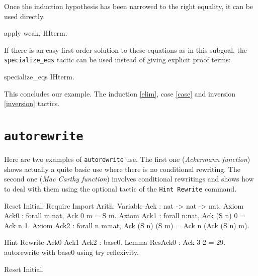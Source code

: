 Once the induction hypothesis has been narrowed to the right equality,
it can be used directly. 

\begin{coq_example}
  apply weak, IHterm.
\end{coq_example}

If there is an easy first-order solution to these equations as in this subgoal, the
{\tt specialize\_eqs} tactic can be used instead of giving explicit proof
terms:

\begin{coq_example}
  specialize_eqs IHterm.
\end{coq_example}
This concludes our example.
\SeeAlso The induction \ref{elim}, case \ref{case} and inversion \ref{inversion} tactics.

\section[\tt autorewrite]{\tt autorewrite\label{autorewrite-example}}

Here are two examples of {\tt autorewrite} use. The first one ({\em Ackermann
function}) shows actually a quite basic use where there is no conditional
rewriting. The second one ({\em Mac Carthy function}) involves conditional
rewritings and shows how to deal with them using the optional tactic of the
{\tt Hint~Rewrite} command.

\firstexample
{}

\begin{coq_example*}
Reset Initial.
Require Import Arith.
Variable Ack : 
           nat -> nat -> nat.
Axiom Ack0 : 
        forall m:nat, Ack 0 m = S m.
Axiom Ack1 : forall n:nat, Ack (S n) 0 = Ack n 1.
Axiom Ack2 : forall n m:nat, Ack (S n) (S m) = Ack n (Ack (S n) m).
\end{coq_example*}

\begin{coq_example}
Hint Rewrite Ack0 Ack1 Ack2 : base0.
Lemma ResAck0 : 
 Ack 3 2 = 29.
autorewrite with base0 using try reflexivity.
\end{coq_example}

\begin{coq_eval}
Reset Initial.
\end{coq_eval}


